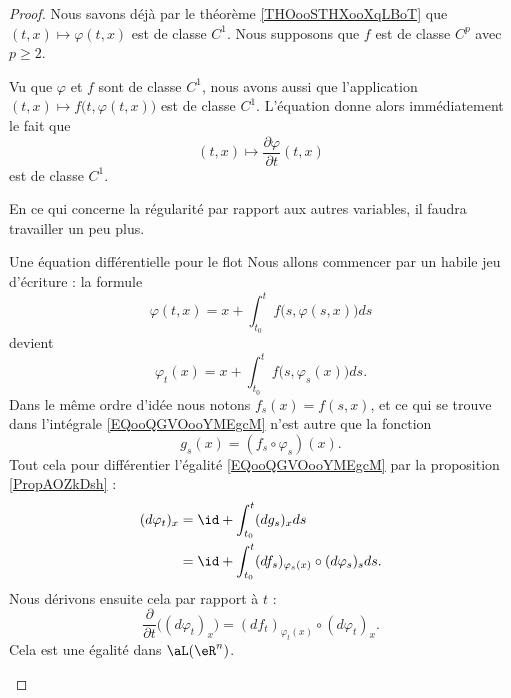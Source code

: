 \begin{proof}
    Nous savons déjà par le théorème \ref{THOooSTHXooXqLBoT} que \( (t,x)\mapsto \varphi(t,x)\) est de classe \( C^1\). Nous supposons que \( f\) est de classe \( C^p\) avec \( p\geq 2\).

    Vu que \( \varphi\) et \( f\) sont de classe \( C^1\), nous avons aussi que l'application \( (t,x)\mapsto f\big( t,\varphi(t,x) \big)\) est de classe \( C^1\). L'équation donne alors immédiatement le fait que
    \begin{equation}
        (t,x)\mapsto\frac{ \partial \varphi }{ \partial t }(t,x)
    \end{equation}
    est de classe \( C^1\).

    En ce qui concerne la régularité par rapport aux autres variables, il faudra travailler un peu plus. 
    
    \begin{subproof}
    \item[Une équation différentielle pour le flot]
    Nous allons commencer par un habile jeu d'écriture : la formule
    \begin{equation}
        \varphi(t,x)=x+\int_{t_0}^tf\big( s,\varphi(s,x) \big)ds
    \end{equation}
    devient
    \begin{equation}        \label{EQooQGVOooYMEgcM}
        \varphi_t(x)=x+\int_{t_0}^tf\big( s,\varphi_s(x) \big)ds.
    \end{equation}
    Dans le même ordre d'idée nous notons \( f_s(x)=f(s,x)\), et ce qui se trouve dans l'intégrale \eqref{EQooQGVOooYMEgcM} n'est autre que la fonction
    \begin{equation}
        g_s(x)=(f_s\circ\varphi_s)(x).
    \end{equation}
    Tout cela pour différentier l'égalité \eqref{EQooQGVOooYMEgcM} par la proposition \ref{PropAOZkDsh} :
    \begin{subequations}
        \begin{align}
            (d\varphi_t)_x&=\id+\int_{t_0}^t(dg_s)_xds\\
            &=\id+\int_{t_0}^t(df_s)_{\varphi_s(x)}\circ(d\varphi_s)_sds.
        \end{align}
    \end{subequations}
    Nous dérivons ensuite cela par rapport à \( t\) :
    \begin{equation}        \label{EQooBETGooXKWRxX}
        \frac{ \partial  }{ \partial t }\Big( (d\varphi_t)_x \Big)=(df_t)_{\varphi_t(x)}\circ(d\varphi_t)_x.
    \end{equation}
    Cela est une égalité dans \( \aL(\eR^n)\).


\end{subproof}
\end{proof}
